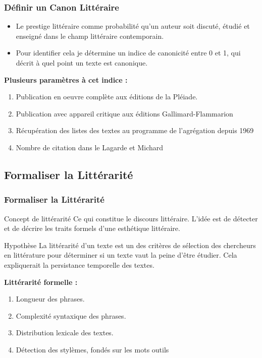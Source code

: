 \documentclass{beamer}
\begin{document}
\begin{frame}
\frametitle{Définir un Canon Littéraire}
\begin{itemize}
    \item Le prestige littéraire comme probabilité qu'un auteur soit discuté, étudié et enseigné dans le champ littéraire\cite{p7} contemporain.
    \item Pour identifier cela je détermine un indice de canonicité entre 0 et 1, qui décrit à quel point un texte est canonique. 
\end{itemize}

\textbf{Plusieurs paramètres à cet indice : }

\begin{enumerate}
\item Publication en oeuvre complète aux éditions de la Pléiade.
\item Publication avec appareil critique aux éditions Gallimard-Flammarion
\item Récupération des listes des textes au programme de l'agrégation depuis 1969
\item Nombre de citation dans le Lagarde et Michard
\end{enumerate}

\end{frame}


\subsection{Formaliser la Littérarité}

\begin{frame}
\frametitle{Formaliser la Littérarité}
\begin{block}{Concept de littérarité}
Ce qui constitue le discours littéraire.\cite{p4} L'idée est de détecter et de décrire les traits formels d'une esthétique littéraire.
\end{block}

\begin{block}{Hypothèse}
 La littérarité d'un texte est un des critères de sélection des chercheurs en littérature pour déterminer si un texte vaut la peine d'être étudier. Cela expliquerait la persistance temporelle des textes.
\end{block}

\textbf{Littérarité formelle : }

\begin{enumerate}
\item Longueur des phrases.
\item Complexité syntaxique des phrases.
\item Distribution lexicale des textes.
\item Détection des stylèmes, fondés sur les mots outils
\end{enumerate}
\end{frame}
\end{document}
